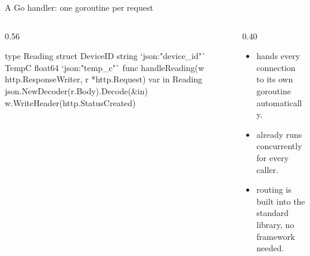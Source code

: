 \documentclass[10pt,aspectratio=169,t]{beamer}
\begin{document}
\begin{frame}[fragile,eyebrow=Goroutines]{A Go handler: one goroutine per request}
  \begin{columns}[T]
    \begin{column}{0.56\textwidth}
\begin{golang}
type Reading struct {
    DeviceID string  `json:"device_id"`
    TempC    float64 `json:"temp_c"`
}
func handleReading(w http.ResponseWriter,
    r *http.Request) {
    var in Reading
    json.NewDecoder(r.Body).Decode(&in)
    w.WriteHeader(http.StatusCreated)
}
\end{golang}
    \end{column}
    \begin{column}{0.40\textwidth}
      \begin{itemize}
        \item {} hands every connection to its own goroutine automatically.
        \item {} already runs concurrently for every caller.
        \item {} routing is built into the standard library, no framework needed.
      \end{itemize}
    \end{column}
  \end{columns}
\end{frame}
\end{document}
